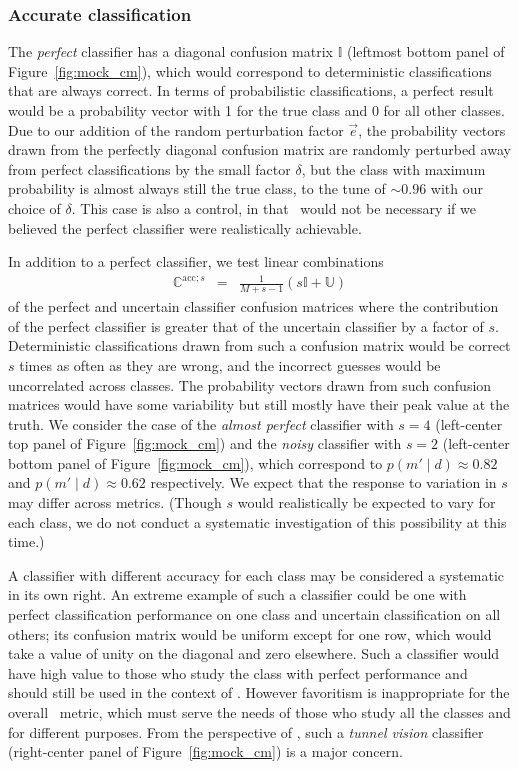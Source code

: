 \subsubsection{Accurate classification}
\label{sec:accuratedata}

The \textit{perfect} classifier has a diagonal confusion matrix $\mathbb{I}$ (leftmost bottom panel of Figure~\ref{fig:mock_cm}), which would correspond to deterministic classifications that are always correct.
In terms of probabilistic classifications, a perfect result would be a probability vector with 1 for the true class and 0 for all other classes.
Due to our addition of the random perturbation factor $\vec{e}$, the probability vectors drawn from the perfectly diagonal confusion matrix are randomly perturbed away from perfect classifications by the small factor $\delta$, but the class with maximum probability is almost always still the true class, to the tune of $\sim0.96$ with our choice of $\delta$.
This case is also a control, in that \plasticc\ would not be necessary if we believed the perfect classifier were realistically achievable.

In addition to a perfect classifier, we test linear combinations
\begin{eqnarray}
  \label{eq:lincomb}
  \mathbb{C}^{\mathrm{acc}; s} &=& \frac{1}{M+s-1} \left(s\mathbb{I} + \mathbb{U}\right)
\end{eqnarray}
of the perfect and uncertain classifier confusion matrices where the contribution of the perfect classifier is greater that of the uncertain classifier by a factor of $s$.
Deterministic classifications drawn from such a confusion matrix would be correct $s$ times as often as they are wrong, and the incorrect guesses would be uncorrelated across classes.
The probability vectors drawn from such confusion matrices would have some variability but still mostly have their peak value at the truth.
We consider the case of the \textit{almost perfect} classifier with $s=4$ (left-center top panel of Figure~\ref{fig:mock_cm}) and the \textit{noisy} classifier with $s=2$ (left-center bottom panel of Figure~\ref{fig:mock_cm}), which correspond to $p(m' \mid d)\approx0.82$ and $p(m' \mid d)\approx0.62$ respectively.
We expect that the response to variation in $s$ may differ across metrics.
(Though $s$ would realistically be expected to vary for each class, we do not conduct a systematic investigation of this possibility at this time.)

A classifier with different accuracy for each class may be considered a systematic in its own right.
An extreme example of such a classifier could be one with perfect classification performance on one class and uncertain classification on all others; its confusion matrix would be uniform except for one row, which would take a value of unity on the diagonal and zero elsewhere.
Such a classifier would have high value to those who study the class with perfect performance and should still be used in the context of \lsst.
However favoritism is inappropriate for the overall \plasticc\ metric, which must serve the needs of those who study all the classes and for different purposes.
From the perspective of \plasticc, such a \textit{tunnel vision} classifier (right-center panel of Figure~\ref{fig:mock_cm}) is a major concern.

